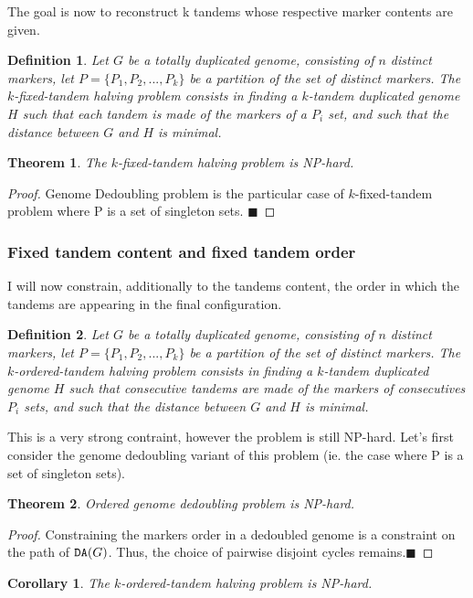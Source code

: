 \documentclass[11pt,final,twoside,nofrench]{thlifl}
\newcommand{\qed}{\ensuremath{\blacksquare}}
\newcommand{\DA}{\ensuremath{\mbox{\texttt{DA}}}}
\newtheorem{proof}{Proof}
\newtheorem{theorem}{Theorem}
\newtheorem{definition}{Definition}
\newtheorem{corollary}{Corollary}
\begin{document}
The goal is now to reconstruct k tandems whose respective marker contents are given.

\begin{definition}
    Let $G$ be a totally duplicated genome, consisting of $n$ distinct markers, let $P = \lbrace P_1, P_2, ... , P_k \rbrace $ be a partition of the set of distinct markers.
The \emph{$k$-fixed-tandem halving} problem consists in finding a $k$-tandem duplicated genome $H$ such that each
    tandem is made of the markers of a $P_i$ set, and such that the distance between $G$ and $H$ is minimal.
\end{definition}

\begin{theorem}
The $k$-fixed-tandem halving problem is NP-hard.
\end{theorem}

\begin{proof}
    Genome Dedoubling problem is the particular case of
    $k$-fixed-tandem problem where P is a set of singleton sets. \qed
\end{proof}

\subsubsection{Fixed tandem content and fixed tandem order}

I will now constrain, additionally to the tandems content, the order in which
the tandems are appearing in the final configuration.

\begin{definition}
    Let $G$ be a totally duplicated genome, consisting of $n$ distinct markers, let $P = \lbrace P_1, P_2, ... , P_k \rbrace $ be a partition of the set of distinct markers.
The \emph{$k$-ordered-tandem halving} problem consists in finding a $k$-tandem duplicated genome $H$ such that consecutive tandems are made of the markers of consecutives $P_i$ sets, and such that the distance between $G$ and $H$ is minimal.
\end{definition}

This is a very strong contraint, however the problem is
still NP-hard.
Let's first consider the genome dedoubling variant of this problem (ie. the case where P is a set of singleton sets).

\begin{theorem}
Ordered genome dedoubling problem is NP-hard.
\end{theorem}
\begin{proof}
Constraining the markers order in a dedoubled genome is a constraint on the path of $\DA(G)$. Thus, the choice of pairwise disjoint cycles remains.\qed
\end{proof}
\begin{corollary}
The $k$-ordered-tandem halving problem is NP-hard.
\end{corollary}
\end{document}
